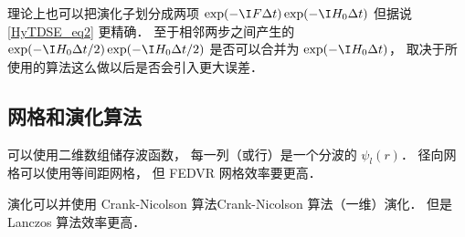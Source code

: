 理论上也可以把演化子划分成两项 $\exp(-\I F \Delta t)\exp(-\I H_0 {\Delta t})$ 但据说\autoref{HyTDSE_eq2} 更精确． 至于相邻两步之间产生的 $\exp(-\I H_0 {\Delta t}/{2})\exp(-\I H_0 {\Delta t}/{2})$ 是否可以合并为 $\exp(-\I H_0 {\Delta t})$， 取决于所使用的算法这么做以后是否会引入更大误差．

\subsection{网格和演化算法}

可以使用二维数组储存波函数， 每一列（或行）是一个分波的 $\psi_l(r)$． 径向网格可以使用等间距网格， 但 FEDVR 网格效率要更高．

演化可以并使用 Crank-Nicolson 算法Crank-Nicolson 算法（一维）演化． 但是 Lanczos 算法效率更高．
